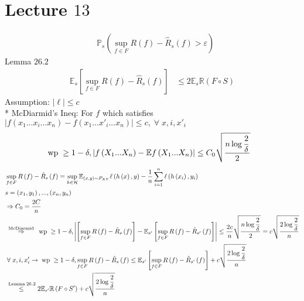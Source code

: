 \documentclass{article}
\begin{document}
\section{Lecture $13$} 
\begin{align*}
&\mathbb{P}_{s}\left(\displaystyle\sup_{f \in F} R\left(f\right) - \hat{R}_{s}\left(f\right) > \varepsilon\right)
\end{align*}
Lemma $26.2$
\begin{align*}
\mathbb{E}_{s} \left[\displaystyle\sup_{f \in F} R\left(f\right) - \hat{R}_{s}\left(f\right)\right] &\leq  2 \mathbb{E}_{s} \mathbb{R}\left(F \circ S\right)
\end{align*}
Assumption: $\left|  \ell  \right| \leq  c $
\\* McDiarmid's Ineq: For $f $ which satisfies $\left|  f\left(x_{1} ... x_{i} ... x_{n}\right) - f\left(x_{1} ... x'_{i} ... x_{n}\right)  \right| \leq  c , \;\forall\; x, i, x'_{i}$
\begin{align*}
\text{\;wp\;} &\geq  1 - \delta, \left|  f\left(X_{1} ... X_{n}\right) - \mathbb{E} f\left(X_{1} ... X_{n}\right)  \right| \leq  C_{0} \sqrt{\dfrac{n \log \dfrac{2}{\delta}}{2}}
\end{align*}
\begin{align*}
&  \displaystyle\sup_{f \in F} R\left(f\right) - \hat{R}_{s}\left(f\right) = \displaystyle\sup_{h \in \mathcal{H}} \mathbb{E}_{\left(x, y\right) \sim  P_{X Y}} \ell\left(h\left(x\right), y\right) - \dfrac{1}{n} \displaystyle\sum_{i=1}^{n} \ell\left(h\left(x_{i}\right), y_{i}\right)
\\ &  s  = \left(x_{1}, y_{1}\right), ..., \left(x_{n}, y_{n}\right)
\\ &\Rightarrow  C_{0} = \dfrac{2 C}{n}
\\ &\stackrel{\text{\;McDiarmid\;}}{\Rightarrow} \text{\;wp\;} \geq  1 - \delta, \left|  \left[\displaystyle\sup_{f \in F} R\left(f\right) - \hat{R}_{s}\left(f\right)\right] - \mathbb{E}_{s'}\left[\displaystyle\sup_{f \in F} R\left(f\right) - \hat{R}_{s'}\left(f\right)\right]  \right| \leq  \dfrac{2 c}{n} \sqrt{\dfrac{n \log \dfrac{2}{\delta}}{2}} = c \sqrt{\dfrac{2 \log \dfrac{2}{\delta}}{n}}
\\ &  \;\forall\; x, i, x'_{i} \to  \text{\;wp\;} \geq  1 - \delta, \displaystyle\sup_{f \in F} R\left(f\right) - \hat{R}_{s}\left(f\right) \leq  \mathbb{E}_{s'}\left[\displaystyle\sup_{f \in F} R\left(f\right) - \hat{R}_{s'}\left(f\right)\right] + c \sqrt{\dfrac{2 \log \dfrac{2}{\delta}}{n}}
\\ &\stackrel{\text{\;Lemma\;} 26.2}{\leq} 2 \mathbb{E}_{s'} \mathbb{R}\left(F \circ S'\right) + c \sqrt{\dfrac{2 \log \dfrac{2}{\delta}}{n}}
\end{align*}
\end{document}
